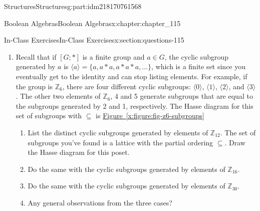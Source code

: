 \documentclass[oneside,10pt,]{book}
\newcommand{\xreffont}{\relax}
\numberwithin{equation}{section}
\begin{document}
\begin{partptx}{Structures}{}{Structures}{}{}{g:part:idm218170761568}
\begin{chapterptx}{Boolean Algebras}{}{Boolean Algebras}{}{}{x:chapter:chapter_115}
\begin{sectionptx}{In-Class Exercises}{}{In-Class Exercises}{}{}{x:section:questions-115}
\begin{enumerate}[label=\arabic*.]
\begin{enumerate}[label=(\alph*)]
\item{}Determine which elements of \(D_6\) have a complement.%
\item{}Determine which elements of \(D_{12}\) have a complement.%
\item{}Determine which elements of \(D_{16}\) have a complement.%
\item{}Determine which elements of \(D_{30}\) have a complement.%
\item{}Given that \(D_n\) is always a distributive lattice, for what values of \(n\) do you suppose \(D_n\) is a boolean algebra?%
\end{enumerate}
%
\item{}Recall that if \([G;*]\) is a finite group and \(a \in G\),  the cyclic subgroup generated by \(a\) is \(\langle a \rangle=\{a, a*a, a*a*a, \dots\}\), which is a finite set since you eventually get to the identity and can stop listing elements.  For example, if the group is \(\mathbb{Z}_{6}\), there are four different cyclic subgroups:  \(\langle 0 \rangle\), \(\langle 1 \rangle\), \(\langle 2 \rangle\), and \(\langle 3 \rangle\).  The other two elements of \(\mathbb{Z}_{6}\), 4 and 5 generate subgroups that are equal to the subgroups generated by 2 and 1, respectively.  The Hasse diagram for this set of subgroups with \(\subseteq\) is \hyperref[x:figure:fig-z6-subgroups]{Figure~{\xreffont\ref{x:figure:fig-z6-subgroups}}}%
\par
%
\begin{enumerate}
\item{}List the distinct cyclic subgroups generated by elements of \(\mathbb{Z}_{12}\). The set of subgroups you've found is a lattice with the partial ordering \(\subseteq\). Draw the Hasse diagram for this poset.%
\item{}Do the same with the cyclic subgroups generated by elements of \(\mathbb{Z}_{16}\).%
\item{}Do the same with the cyclic subgroups generated by elements of \(\mathbb{Z}_{30}\).%
\item{}Any general observations from the three cases?%
\end{enumerate}
%
\end{enumerate}
%
\end{sectionptx}
\end{chapterptx}
%
\typeout{************************************************}
\typeout{************************************************}

\end{partptx}
\end{document}
